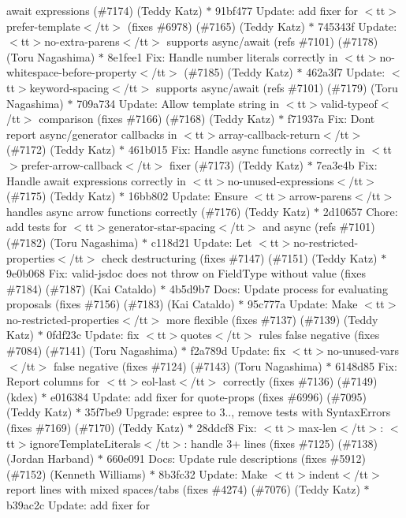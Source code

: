 \begin{DoxyItemize}
await expressions (\#7174) (\+Teddy Katz) \texorpdfstring{$\ast$}{*} 91bf477 Update\+: add fixer for $<$tt$>$prefer-\/template$<$/tt$>$ (fixes \#6978) (\#7165) (\+Teddy Katz) \texorpdfstring{$\ast$}{*} 745343f Update\+: $<$tt$>$no-\/extra-\/parens$<$/tt$>$ supports async/await (refs \#7101) (\#7178) (\+Toru Nagashima) \texorpdfstring{$\ast$}{*} 8e1fee1 Fix\+: Handle number literals correctly in $<$tt$>$no-\/whitespace-\/before-\/property$<$/tt$>$ (\#7185) (\+Teddy Katz) \texorpdfstring{$\ast$}{*} 462a3f7 Update\+: $<$tt$>$keyword-\/spacing$<$/tt$>$ supports async/await (refs \#7101) (\#7179) (\+Toru Nagashima) \texorpdfstring{$\ast$}{*} 709a734 Update\+: Allow template string in $<$tt$>$valid-\/typeof$<$/tt$>$ comparison (fixes \#7166) (\#7168) (\+Teddy Katz) \texorpdfstring{$\ast$}{*} f71937a Fix\+: Don\textquotesingle{}t report async/generator callbacks in $<$tt$>$array-\/callback-\/return$<$/tt$>$ (\#7172) (\+Teddy Katz) \texorpdfstring{$\ast$}{*} 461b015 Fix\+: Handle async functions correctly in $<$tt$>$prefer-\/arrow-\/callback$<$/tt$>$ fixer (\#7173) (\+Teddy Katz) \texorpdfstring{$\ast$}{*} 7ea3e4b Fix\+: Handle await expressions correctly in $<$tt$>$no-\/unused-\/expressions$<$/tt$>$ (\#7175) (\+Teddy Katz) \texorpdfstring{$\ast$}{*} 16bb802 Update\+: Ensure $<$tt$>$arrow-\/parens$<$/tt$>$ handles async arrow functions correctly (\#7176) (\+Teddy Katz) \texorpdfstring{$\ast$}{*} 2d10657 Chore\+: add tests for $<$tt$>$generator-\/star-\/spacing$<$/tt$>$ and async (refs \#7101) (\#7182) (\+Toru Nagashima) \texorpdfstring{$\ast$}{*} c118d21 Update\+: Let $<$tt$>$no-\/restricted-\/properties$<$/tt$>$ check destructuring (fixes \#7147) (\#7151) (\+Teddy Katz) \texorpdfstring{$\ast$}{*} 9e0b068 Fix\+: valid-\/jsdoc does not throw on Field\+Type without value (fixes \#7184) (\#7187) (\+Kai Cataldo) \texorpdfstring{$\ast$}{*} 4b5d9b7 Docs\+: Update process for evaluating proposals (fixes \#7156) (\#7183) (\+Kai Cataldo) \texorpdfstring{$\ast$}{*} 95c777a Update\+: Make $<$tt$>$no-\/restricted-\/properties$<$/tt$>$ more flexible (fixes \#7137) (\#7139) (\+Teddy Katz) \texorpdfstring{$\ast$}{*} 0fdf23c Update\+: fix $<$tt$>$quotes$<$/tt$>$ rule\textquotesingle{}s false negative (fixes \#7084) (\#7141) (\+Toru Nagashima) \texorpdfstring{$\ast$}{*} f2a789d Update\+: fix $<$tt$>$no-\/unused-\/vars$<$/tt$>$ false negative (fixes \#7124) (\#7143) (\+Toru Nagashima) \texorpdfstring{$\ast$}{*} 6148d85 Fix\+: Report columns for $<$tt$>$eol-\/last$<$/tt$>$ correctly (fixes \#7136) (\#7149) (kdex) \texorpdfstring{$\ast$}{*} e016384 Update\+: add fixer for quote-\/props (fixes \#6996) (\#7095) (\+Teddy Katz) \texorpdfstring{$\ast$}{*} 35f7be9 Upgrade\+: espree to 3.., remove tests with Syntax\+Errors (fixes \#7169) (\#7170) (\+Teddy Katz) \texorpdfstring{$\ast$}{*} 28ddcf8 Fix\+: $<$tt$>$max-\/len$<$/tt$>$\+: $<$tt$>$ignore\+Template\+Literals$<$/tt$>$\+: handle 3+ lines (fixes \#7125) (\#7138) (\+Jordan Harband) \texorpdfstring{$\ast$}{*} 660e091 Docs\+: Update rule descriptions (fixes \#5912) (\#7152) (\+Kenneth Williams) \texorpdfstring{$\ast$}{*} 8b3fc32 Update\+: Make $<$tt$>$indent$<$/tt$>$ report lines with mixed spaces/tabs (fixes \#4274) (\#7076) (\+Teddy Katz) \texorpdfstring{$\ast$}{*} b39ac2c Update\+: add fixer for 
\end{DoxyItemize}
